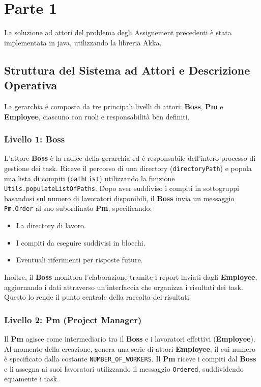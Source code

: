\chapter{Parte 1}
\label{ch:into} %

La soluzione ad attori del problema degli Assignement precedenti è stata implementata in java, utilizzando la libreria Akka.

\section{Struttura del Sistema ad Attori e Descrizione Operativa}

La gerarchia è composta da tre principali livelli di attori: \textbf{Boss}, \textbf{Pm} e \textbf{Employee}, ciascuno con ruoli e responsabilità ben definiti.

\subsection{Livello 1: Boss}
L'attore \textbf{Boss} è la radice della gerarchia ed è responsabile dell'intero processo di gestione dei task. Riceve il percorso di una directory (\texttt{directoryPath}) e popola una lista di compiti (\texttt{pathList}) utilizzando la funzione \texttt{Utils.populateListOfPaths}. Dopo aver suddiviso i compiti in sottogruppi basandosi sul numero di lavoratori disponibili, il \textbf{Boss} invia un messaggio \texttt{Pm.Order} al suo subordinato \textbf{Pm}, specificando:
\begin{itemize}
    \item La directory di lavoro.
    \item I compiti da eseguire suddivisi in blocchi.
    \item Eventuali riferimenti per risposte future.
\end{itemize}

Inoltre, il \textbf{Boss} monitora l'elaborazione tramite i report inviati dagli \textbf{Employee}, aggiornando i dati attraverso un’interfaccia che organizza i risultati dei task. Questo lo rende il punto centrale della raccolta dei risultati.

\subsection{Livello 2: Pm (Project Manager)}
Il \textbf{Pm} agisce come intermediario tra il \textbf{Boss} e i lavoratori effettivi (\textbf{Employee}). Al momento della creazione, genera una serie di attori \textbf{Employee}, il cui numero è specificato dalla costante \texttt{NUMBER\_OF\_WORKERS}. Il \textbf{Pm} riceve i compiti dal \textbf{Boss} e li assegna ai suoi lavoratori utilizzando il messaggio \texttt{Ordered}, suddividendo equamente i task.  

